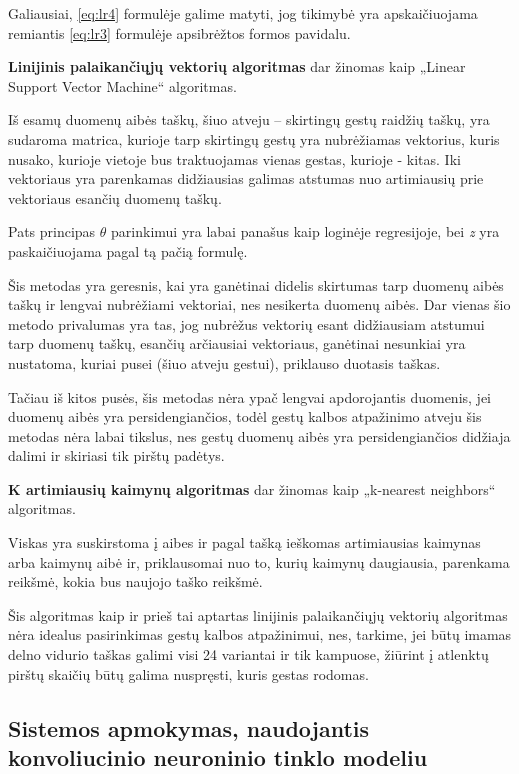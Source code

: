 \documentclass{VUMIFInfKursinis}
\begin{document}
Galiausiai, \ref{eq:lr4} formulėje galime matyti, jog tikimybė yra apskaičiuojama remiantis \ref{eq:lr3} formulėje apsibrėžtos formos pavidalu.


\textbf{Linijinis palaikančiųjų vektorių algoritmas} dar žinomas kaip „Linear Support Vector Machine“ algoritmas.

Iš esamų duomenų aibės taškų, šiuo atveju – skirtingų gestų raidžių taškų, yra sudaroma matrica, kurioje tarp skirtingų gestų yra nubrėžiamas vektorius, kuris nusako, kurioje vietoje bus traktuojamas vienas gestas, kurioje - kitas. Iki vektoriaus yra parenkamas didžiausias galimas atstumas nuo artimiausių prie vektoriaus esančių duomenų taškų. 

Pats principas $\theta$ parinkimui yra labai panašus kaip loginėje regresijoje, bei \textit{z} yra paskaičiuojama pagal tą pačią formulę.

Šis metodas yra geresnis, kai yra ganėtinai didelis skirtumas tarp duomenų aibės taškų ir lengvai nubrėžiami vektoriai, nes nesikerta duomenų aibės. Dar vienas šio metodo privalumas yra tas, jog nubrėžus vektorių esant didžiausiam atstumui tarp duomenų taškų, esančių arčiausiai vektoriaus, ganėtinai nesunkiai yra nustatoma, kuriai pusei (šiuo atveju gestui), priklauso duotasis taškas.

Tačiau iš kitos pusės, šis metodas nėra ypač lengvai apdorojantis duomenis, jei duomenų aibės yra persidengiančios, todėl gestų kalbos atpažinimo atveju šis metodas nėra labai tikslus, nes gestų duomenų aibės yra persidengiančios didžiaja dalimi ir skiriasi tik pirštų padėtys.


\textbf{K artimiausių kaimynų algoritmas} dar žinomas kaip „k-nearest neighbors“ algoritmas.

Viskas yra suskirstoma į aibes ir pagal tašką ieškomas artimiausias kaimynas arba kaimynų aibė ir, priklausomai nuo to, kurių kaimynų daugiausia, parenkama reikšmė, kokia bus naujojo taško reikšmė.

Šis algoritmas kaip ir prieš tai aptartas linijinis palaikančiųjų vektorių algoritmas nėra idealus pasirinkimas gestų kalbos atpažinimui, nes, tarkime, jei būtų imamas delno vidurio taškas galimi visi 24 variantai ir tik kampuose, žiūrint į atlenktų pirštų skaičių būtų galima nuspręsti, kuris gestas rodomas.


\subsection{Sistemos apmokymas, naudojantis konvoliucinio neuroninio tinklo modeliu}
\end{document}
